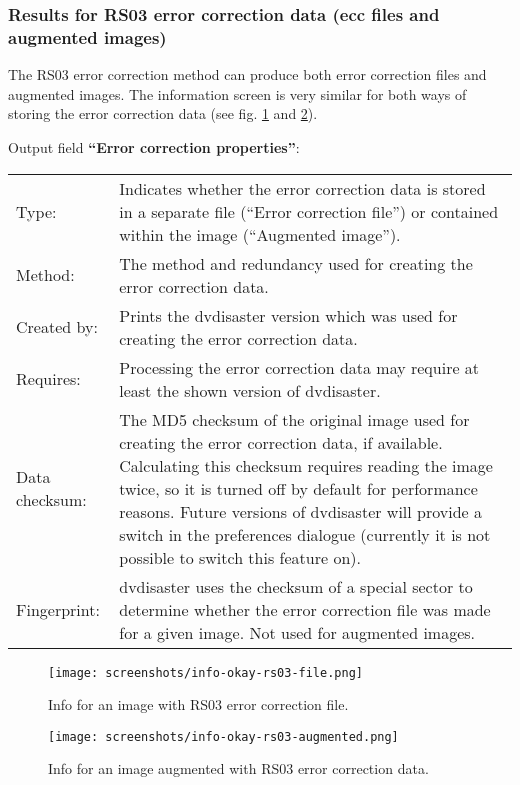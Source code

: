 \subsubsection{Results for RS03 error correction data (ecc files and augmented images)}
\label{howto-info-rs03}

The RS03 error correction method can produce both error correction files
and augmented images. The information screen is very similar for both ways
of storing the error correction data (see fig. \ref{howto-info-good-rs03-file}
and  \ref{howto-info-good-rs03-augmented}).

\bigskip

Output field {\bf ``Error correction properties''}:

\medskip

\begin{tabular}{lp{126mm}}
  Type: &
  Indicates whether the error correction data is stored
  in a separate file (``Error correction file'') or contained
  within the image (``Augmented image''). \\
 	
  Method: &
  The method and redundancy used for creating the error correction data. \\
 	
  Created by: &
  Prints the dvdisaster version which was used for creating the error correction data. \\
 	
  Requires: &
  Processing the error correction data may require at least the shown version
  of dvdisaster. \\
 	
  Data checksum: &
  The MD5 checksum of the original image used for creating
  the error correction data, if available. Calculating this
  checksum requires reading the image twice, so it is turned off by default
  for performance reasons. Future versions of dvdisaster will provide a switch
  in the preferences dialogue (currently it is not possible to switch this feature on).\\

  Fingerprint: &
  dvdisaster uses the checksum of a special sector to determine 
  whether the error correction file was made for a given image.
  Not used for augmented images.\\

\end{tabular}

\newpage
\begin{figure}[h]
\vspace*{-5mm}
\centerline{\texttt{[image: screenshots/info-okay-rs03-file.png]}}
\caption{Info for an image with RS03 error correction file.}
\label{howto-info-good-rs03-file}
\end{figure}
\begin{figure}[h]
\centerline{\texttt{[image: screenshots/info-okay-rs03-augmented.png]}}
\caption{Info for an image augmented with RS03 error correction data.}
\vspace*{-50mm}
\label{howto-info-good-rs03-augmented}
\end{figure}
\newpage

